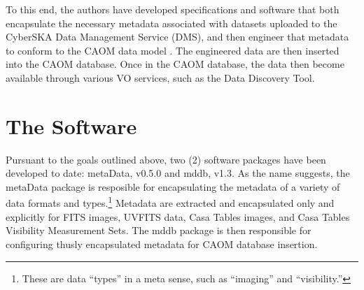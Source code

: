 To this end, the authors have developed  specifications and software
that both encapsulate the necessary metadata associated with datasets
uploaded to the  CyberSKA Data Management Service (DMS), and then
engineer that metadata to conform to the CAOM data
model \citep{dowler_2007}. The engineered data are then inserted into
the CAOM database. Once in the CAOM database, the data then become
available through various VO services, such as the Data Discovery Tool. 

\section{The Software}
Pursuant to the goals outlined above, two (2) software packages have
been developed to date: metaData, v0.5.0 and mddb, v1.3. As the name
suggests, the metaData package is resposible for encapsulating
the metadata of a variety of data formats and types.\footnote{These
  are data ``types'' in a meta sense, such as ``imaging'' and ``visibility.''}
Metadata are extracted and encapsulated only and explicitly for FITS
images, UVFITS data, Casa Tables images, and Casa Tables Visibility
Measurement Sets. The mddb package is then responsible for configuring
thusly encapsulated metadata for CAOM database insertion.

